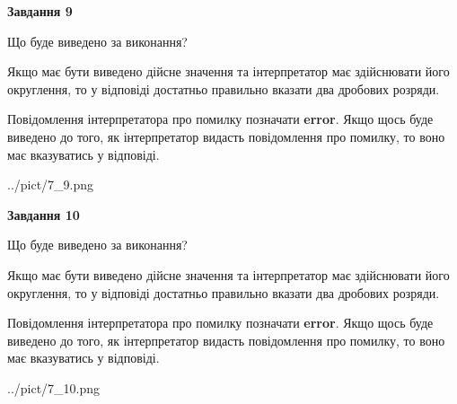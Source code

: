 \documentclass[12pt, ukrainian]{article}
\begin{document}
{\begin {Large}
{\begin {center}\textbf{Завдання 9}\end {center}}\par
Що буде виведено за виконання? \par

Якщо має бути виведено дійсне значення та інтерпретатор має здійснювати його округлення, 
то у відповіді достатньо правильно вказати два дробових розряди.

Повідомлення інтерпретатора про помилку позначати \textbf{error}.
Якщо щось буде виведено до того, як інтерпретатор видасть повідомлення про помилку, 
то воно має вказуватись у відповіді. \par

\begin{center}
	{../pict/7_9.png}
\end{center}
\newpage

{\begin {center}\textbf{Завдання 10}\end {center}}\par
Що буде виведено за виконання? \par

Якщо має бути виведено дійсне значення та інтерпретатор має здійснювати його округлення, 
то у відповіді достатньо правильно вказати два дробових розряди.

Повідомлення інтерпретатора про помилку позначати \textbf{error}.
Якщо щось буде виведено до того, як інтерпретатор видасть повідомлення про помилку, 
то воно має вказуватись у відповіді. \par

\begin{center}
	{../pict/7_10.png}
\end{center}
\newpage

\end {Large}}
\end{document}
